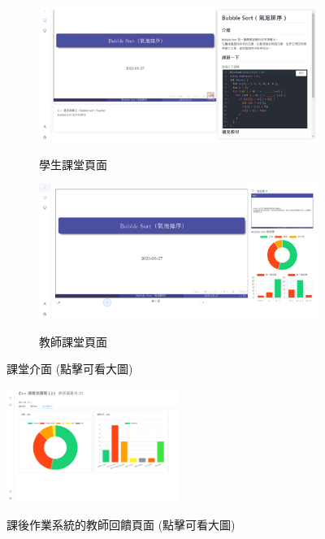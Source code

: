 \documentclass[12pt]{article}
\begin{document}
\begin{enumerate}
    \begin{figure}[H]
      \begin{subfigure}{0.5\linewidth}
        \centering
        \href{https://raw.githubusercontent.com/programingtw/proglearn-plan/main/img/student.png}{ 
          \includegraphics[width=1\textwidth]{./img/student.png}
        }
        \caption{學生課堂頁面}
        \label{arc15}
      \end{subfigure}
      \begin{subfigure}{0.5\linewidth}
          \centering
          \href{https://raw.githubusercontent.com/programingtw/proglearn-plan/main/img/teacher.png}{ 
            \includegraphics[width=1\textwidth]{./img/teacher.png}
          }
        \caption{教師課堂頁面}
        \label{arc9}
      \end{subfigure}
      \caption{課堂介面 (點擊可看大圖)}
    \end{figure}
    
    \begin{figure}[H]
      \centering
      \href{https://raw.githubusercontent.com/programingtw/proglearn-plan/main/img/feedback.png}{ 
        \includegraphics[width=0.5\textwidth]{./img/feedback.png}
      }
      \caption{課後作業系統的教師回饋頁面 (點擊可看大圖)}
      \label{arc14}
    \end{figure}
    

\end{enumerate}
\end{document}
